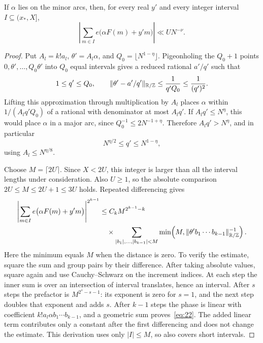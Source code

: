 \begin{lemma}
\label{kernel:weyl}
If $\alpha$ lies on the minor arcs, then, for every real $y'$ and every
integer interval $I\subseteq(x_*,X]$,
\begin{equation}
 \left|\sum_{m\in I}e\bigl(\alpha F(m)+y'm\bigr)\right|
       \ll U N^{-\nu}.
 \label{eq:21}
\end{equation}
\end{lemma}

\begin{proof}
Put $A_l=k!a_l$, $\theta'=A_l\alpha$, and
$Q_0=\lfloor N^{1-\eta}\rfloor$. Pigeonholing the $Q_0+1$ points
$0,\theta',\ldots,Q_0\theta'$ into $Q_0$ equal intervals gives a reduced
rational $a'/q'$ such that
\[
 1\le q'\le Q_0,\qquad
 \|\theta'-a'/q'\|_{\mathbb R/\mathbb Z}\le\frac1{q'Q_0}\le\frac1{(q')^2}.
\]
Lifting this approximation through multiplication by $A_l$ places
$\alpha$ within $1/(A_lq'Q_0)$ of a rational with denominator at most
$A_lq'$. If $A_lq'\le N^\eta$, this would place $\alpha$ in a major
arc, since $Q_0^{-1}\le2N^{-1+\eta}$. Therefore
$A_lq'>N^\eta$, and in particular
\[
 N^{\eta/2}\le q'\le N^{1-\eta},
\]
using $A_l\le N^{\eta/8}$.

Choose $M=\lceil2U\rceil$. Since $X<2U$, this integer is larger than all
the interval lengths under consideration. Also $U\ge1$, so the absolute
comparison $2U\le M\le2U+1\le3U$ holds. Repeated differencing gives
\begin{equation}
 \begin{split}
 \left|\sum_{m\in I}e\bigl(\alpha F(m)+y'm\bigr)\right|^{2^{k-1}}
 &\le C_k M^{2^{k-1}-k}\\
 &\quad\times\sum_{|b_1|,\ldots,|b_{k-1}|<M}
 \min\!\left(M,\|\theta'b_1\cdots b_{k-1}\|_{\mathbb R/\mathbb Z}^{-1}\right).
 \end{split}
 \label{eq:22}
\end{equation}
Here the minimum equals $M$ when the distance is zero. To verify the
estimate, square the sum and group pairs by their difference. After
taking absolute values, square again and use Cauchy--Schwarz on the
increment indices. At each step the inner sum is over an intersection
of interval translates, hence an interval. After $s$ steps the prefactor
is $M^{2^s-s-1}$: its exponent is zero for $s=1$, and the next step
doubles that exponent and adds $s$. After $k-1$ steps the phase is
linear with coefficient $k!a_l\alpha b_1\cdots b_{k-1}$, and a geometric
sum proves~\eqref{eq:22}. The added linear term contributes only a
constant after the first differencing and does not change the estimate.
This derivation uses only $|I|\le M$, so also covers short intervals.


\end{proof}
